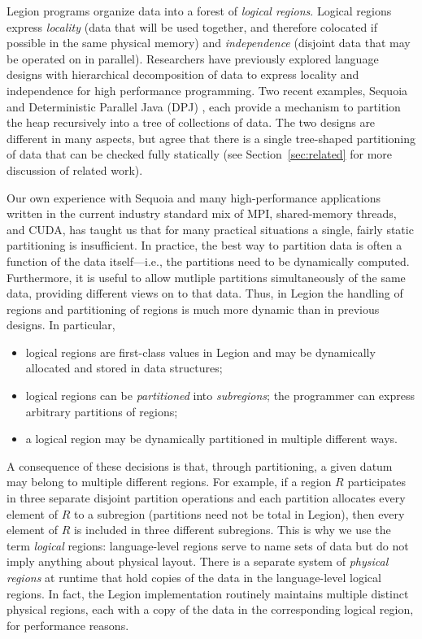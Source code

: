Legion programs organize data into a forest of {\em logical regions}.  Logical
regions express {\em locality} (data that will be used together, and therefore colocated if possible in the same
physical memory) and {\em independence} (disjoint data that may be operated on in parallel).
Researchers have previously explored language designs with hierarchical decomposition of data to express
locality and independence for high performance programming. Two recent examples, Sequoia \cite{Fatahalion06} and 
Deterministic Parallel Java (DPJ) \cite{Bocchino09}, each provide a mechanism to partition the heap recursively
into a tree of collections of data.  The two designs are different in many aspects, but agree that there is
a single tree-shaped partitioning of data that can be checked fully statically (see Section~\ref{sec:related} for more
discussion of related work).

Our own experience with Sequoia and many high-performance applications
written in the current industry standard mix of MPI, shared-memory
threads, and CUDA, has taught us that for many practical situations a
single, fairly static partitioning is insufficient.  In practice, the
best way to partition data is often a function of the data
itself---i.e., the partitions need to be dynamically computed.
Furthermore, it is useful to allow mutliple partitions simultaneously of
the same data, providing different views on to that data. Thus, in Legion the 
handling of regions and partitioning of regions is much more dynamic than in 
previous designs.  In particular,
\begin{itemize}
\item  logical regions are first-class values in Legion
and may be dynamically allocated and stored in data structures;

\item logical regions can be {\em partitioned} into {\em subregions}; the programmer can express arbitrary partitions of
regions;

\item  a logical region may be dynamically partitioned in multiple different ways.
\end{itemize}
A consequence of these decisions is that, through partitioning, a
given datum may belong to multiple different regions.  For example, if
a region $R$ participates in three separate disjoint partition
operations and each partition allocates every element of $R$ to a
subregion (partitions need not be total in Legion), then every element
of $R$ is included in three different subregions.  This is why we use
the term {\em logical} regions: language-level regions serve to name
sets of data but do not imply anything about physical layout.  There
is a separate system of {\em physical regions} at runtime that hold
copies of the data in the language-level logical regions.  In fact,
the Legion implementation routinely maintains multiple distinct
physical regions, each with a copy of the data in the corresponding
logical region, for performance reasons.

